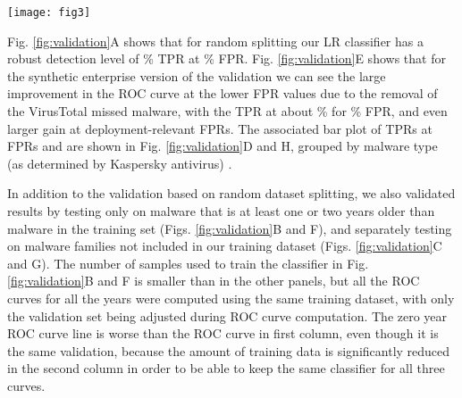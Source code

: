 \documentclass{sig-alternate-2013}
\begin{document}
\begin{figure*}[ht]
	\center
	\texttt{[image: fig3]}
   \caption{-fold validation results for our -regularized LR classifier. The top panels are validation results computed only on CuckooBox collected audit log data, while the bottom panels show validation results done only on synthetic malware and pure benign enterprise audit logs. Each column shares the same classifier between the top and bottom panel. The first column shows the ROC validation curves for randomly split data. The second column shows ROC validation curves based on compile time splits, where the training malware data is at least one (middle line) or two (bottom line) years older than validation malware data. The third column show ROC validation curved based on malware families splits, where we train on one set of malware families, and validate on the rest of the families. The fourth column shows results from the first column, at two deployment-relevant false positive rates ( top and blue, and  bottom and yellow), broken down by specific malware types, with the number of total observations of each malware type is shown on the right axis. }
   	\label{fig:validation}
\end{figure*}

Fig. \ref{fig:validation}A shows that for random splitting our LR classifier has a robust detection level of \% TPR at \% FPR. Fig. \ref{fig:validation}E shows that for the synthetic enterprise version of the validation we can see the large improvement in the ROC curve at the lower FPR values due to the removal of the VirusTotal missed malware, with the TPR at about \% for \% FPR, and even larger gain at deployment-relevant FPRs. The associated bar plot of TPRs at FPRs  and  are shown in Fig. \ref{fig:validation}D and H, grouped by malware type (as determined by Kaspersky antivirus) .

In addition to the validation based on random dataset splitting, we also validated results by testing only on malware that is at least one or two years older than malware in the training set (Figs. \ref{fig:validation}B and F), and separately testing on malware families not included in our training dataset (Figs. \ref{fig:validation}C and G). The number of samples used to train the classifier in Fig. \ref{fig:validation}B and F is smaller than in the other panels, but all the ROC curves for all the years were computed using the same training dataset, with only the validation set being adjusted during ROC curve computation. The zero year ROC curve line is worse than the ROC curve in first column, even though it is the same validation, because the amount of training data is significantly reduced in the second column in order to be able to keep the same classifier for all three curves. 
\end{document}
